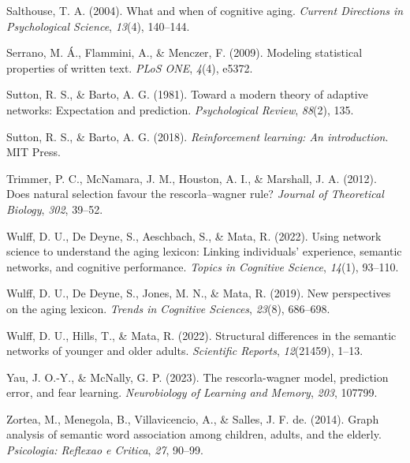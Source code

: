 \documentclass[
  man]{apa6}
\newlength{\cslhangindent}
\newlength{\cslentryspacingunit} %
\newenvironment{CSLReferences}[2] %
 {%
  \setlength{\parindent}{0pt}
  \ifodd #1
  \let\oldpar\par
  \def\par{\hangindent=\cslhangindent\oldpar}
  \fi
  \setlength{\parskip}{#2\cslentryspacingunit}
 }%
 {}
\begin{document}
\begin{CSLReferences}{1}{0}
\leavevmode{}%
Salthouse, T. A. (2004). {What and when of cognitive aging}. \emph{Current Directions in Psychological Science}, \emph{13}(4), 140--144.

\leavevmode{}%
Serrano, M. Á., Flammini, A., \& Menczer, F. (2009). Modeling statistical properties of written text. \emph{PLoS ONE}, \emph{4}(4), e5372.

\leavevmode{}%
Sutton, R. S., \& Barto, A. G. (1981). Toward a modern theory of adaptive networks: Expectation and prediction. \emph{Psychological Review}, \emph{88}(2), 135.

\leavevmode{}%
Sutton, R. S., \& Barto, A. G. (2018). \emph{Reinforcement learning: An introduction}. MIT Press.

\leavevmode{}%
Trimmer, P. C., McNamara, J. M., Houston, A. I., \& Marshall, J. A. (2012). Does natural selection favour the rescorla--wagner rule? \emph{Journal of Theoretical Biology}, \emph{302}, 39--52.

\leavevmode{}%
Wulff, D. U., De Deyne, S., Aeschbach, S., \& Mata, R. (2022). Using network science to understand the aging lexicon: Linking individuals' experience, semantic networks, and cognitive performance. \emph{Topics in Cognitive Science}, \emph{14}(1), 93--110.

\leavevmode{}%
Wulff, D. U., De Deyne, S., Jones, M. N., \& Mata, R. (2019). New perspectives on the aging lexicon. \emph{Trends in Cognitive Sciences}, \emph{23}(8), 686--698.

\leavevmode{}%
Wulff, D. U., Hills, T., \& Mata, R. (2022). Structural differences in the semantic networks of younger and older adults. \emph{Scientific Reports}, \emph{12}(21459), 1--13.

\leavevmode{}%
Yau, J. O.-Y., \& McNally, G. P. (2023). The rescorla-wagner model, prediction error, and fear learning. \emph{Neurobiology of Learning and Memory}, \emph{203}, 107799.

\leavevmode{}%
Zortea, M., Menegola, B., Villavicencio, A., \& Salles, J. F. de. (2014). Graph analysis of semantic word association among children, adults, and the elderly. \emph{Psicologia: Reflexao e Critica}, \emph{27}, 90--99.

\end{CSLReferences}
\end{document}
